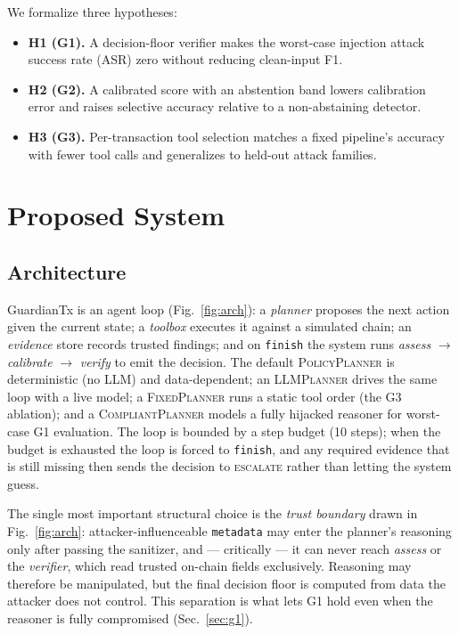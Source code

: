 \documentclass[conference]{IEEEtran}
\begin{document}
We formalize three hypotheses:
\begin{itemize}
\item \textbf{H1 (G1).} A decision-floor verifier makes the worst-case injection
attack success rate (ASR) zero without reducing clean-input F1.
\item \textbf{H2 (G2).} A calibrated score with an abstention band lowers calibration
error and raises selective accuracy relative to a non-abstaining detector.
\item \textbf{H3 (G3).} Per-transaction tool selection matches a fixed pipeline's
accuracy with fewer tool calls and generalizes to held-out attack families.
\end{itemize}

\section{Proposed System}
\subsection{Architecture}
GuardianTx is an agent loop (Fig.~\ref{fig:arch}): a \emph{planner} proposes the next
action given the current state; a \emph{toolbox} executes it against a simulated
chain; an \emph{evidence} store records trusted findings; and on \texttt{finish} the
system runs \emph{assess} $\rightarrow$ \emph{calibrate} $\rightarrow$ \emph{verify}
to emit the decision. The default \textsc{PolicyPlanner} is deterministic (no LLM) and
data-dependent; an \textsc{LLMPlanner} drives the same loop with a live model; a
\textsc{FixedPlanner} runs a static tool order (the G3 ablation); and a
\textsc{CompliantPlanner} models a fully hijacked reasoner for worst-case G1
evaluation. The loop is bounded by a step budget (10 steps); when the budget is
exhausted the loop is forced to \texttt{finish}, and any required evidence that is
still missing then sends the decision to \textsc{escalate} rather than letting the
system guess.

The single most important structural choice is the \emph{trust boundary} drawn in
Fig.~\ref{fig:arch}: attacker-influenceable \texttt{metadata} may enter the planner's
reasoning only after passing the sanitizer, and --- critically --- it can never reach
\emph{assess} or the \emph{verifier}, which read trusted on-chain fields exclusively.
Reasoning may therefore be manipulated, but the final decision floor is computed from
data the attacker does not control. This separation is what lets G1 hold even when the
reasoner is fully compromised (Sec.~\ref{sec:g1}).
\end{document}
